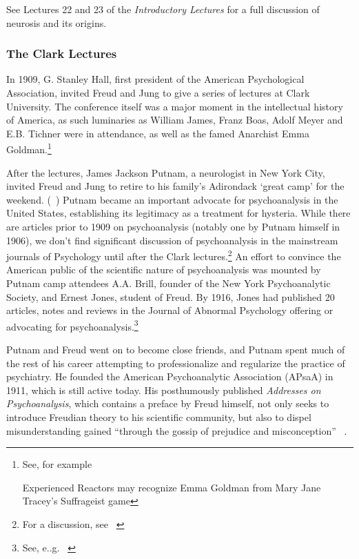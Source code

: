 \begin{refsection}
See Lectures 22 and 23 of the \emph{Introductory Lectures} for a full discussion of neurosis and its origins.

\subsubsection{The Clark Lectures}
\label{theclarklectures}

In 1909, G. Stanley Hall, first president of the American Psychological Association, invited Freud and Jung to give a series of lectures at Clark University. The conference itself was a major moment in the intellectual history of America, as such luminaries as William James, Franz Boas, Adolf Meyer and E.B. Tichner were in attendance, as well as the famed Anarchist Emma Goldman.\footnote{See, for example ~\citep{Jacoby:2009tt}

Experienced Reactors may recognize Emma Goldman from Mary Jane Tracey's Suffrageist game}

After the lectures, James Jackson Putnam, a neurologist in New York City, invited Freud and Jung to retire to his family's Adirondack `great camp' for the weekend. (~\citep{Prochnik:FiwLnN1z}) Putnam became an important advocate for psychoanalysis in the United States, establishing its legitimacy as a treatment for hysteria. While there are articles prior to 1909 on psychoanalysis (notably one by Putnam himself in 1906), we don't find significant discussion of psychoanalysis in the mainstream journals of Psychology until after the Clark lectures.\footnote{For a discussion, see ~\citep{Hornstein:2002wq}} An effort to convince the American public of the scientific nature of psychoanalysis was mounted by Putnam camp attendees A.A. Brill, founder of the New York Psychoanalytic Society, and Ernest Jones, student of Freud. By 1916, Jones had published 20 articles, notes and reviews in the Journal of Abnormal Psychology offering or advocating for psychoanalysis.\footnote{See, e..g. ~\citep[p. 474]{Hornstein:2002wq}}

Putnam and Freud went on to become close friends, and Putnam spent much of the rest of his career attempting to professionalize and regularize the practice of psychiatry. He founded the American Psychoanalytic Association (APsaA) in 1911, which is still active today. His posthumously published \emph{Addresses on Psychoanalysis}, which contains a preface by Freud himself, not only seeks to introduce Freudian theory to his scientific community, but also to dispel misunderstanding gained ``through the gossip of prejudice and misconception'' ~\citep[p. 3]{Putnam:1921uc}.


\end{refsection}
